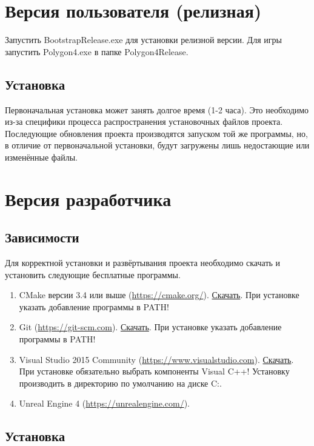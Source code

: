 \documentclass[a4paper,12pt]{report}
\begin{document}
\section{Версия пользователя (релизная)}

Запустить BootstrapRelease.exe для установки релизной версии.
Для игры запустить Polygon4.exe в папке Polygon4Release.

\subsection{Установка}

Первоначальная установка может занять долгое время (1-2 часа).
Это необходимо из-за специфики процесса распространения установочных файлов проекта.
Последующие обновления проекта производятся запуском той же программы, но, в отличие от первоначальной установки, будут загружены лишь недостающие или изменённые файлы.


\section{Версия разработчика}

\subsection{Зависимости}

Для корректной установки и развёртывания проекта необходимо скачать и установить следующие бесплатные программы.

\begin{enumerate}
\item CMake версии 3.4 или выше (\url{https://cmake.org/}).  \href{https://cmake.org/files/v3.4/cmake-3.4.0-win32-x86.exe}{Скачать}. При установке указать добавление программы в PATH!
\item Git (\url{https://git-scm.com}). \href{https://git-scm.com/download/win}{Скачать}. При установке указать добавление программы в PATH!
\item Visual Studio 2015 Community (\url{https://www.visualstudio.com}). \href{https://go.microsoft.com/fwlink/?LinkId=691978}{Скачать}. При установке обязательно выбрать компоненты Visual C++! Установку производить в директорию по умолчанию на диске C:.
\item Unreal Engine 4 (\url{https://unrealengine.com/}).
\end{enumerate}

\subsection{Установка}
\end{document}
